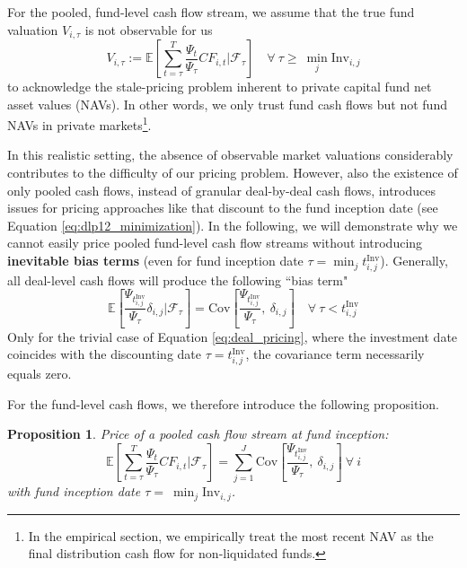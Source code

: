 \documentclass[12pt]{article}
\newtheorem{proposition}{Proposition}
\begin{document}
For the pooled, fund-level cash flow stream, we assume that the true fund valuation $V_{i,\tau}$ is not observable for us
\begin{equation}
	\label{eq:fund_valuation}
	V_{i,\tau} :=
	\mathbb{E} \left[ 
	\sum_{t = \tau}^T
	\frac{\Psi_{t}}{\Psi_{\tau}}
	{CF}_{i,t}
	\left| \mathcal{F}_{\tau} \right.
	\right]
	\quad \forall \ \tau \geq \ \min_j \mathrm{Inv}_{i,j}
\end{equation}
to acknowledge the stale-pricing problem inherent to private capital fund net asset values (NAVs).
In other words, we only trust fund cash flows but not fund NAVs in private markets\footnote{In the empirical section, we empirically treat the most recent NAV as the final distribution cash flow for non-liquidated funds.}.

In this realistic setting, the absence of observable market valuations considerably contributes to the difficulty of our pricing problem.
However, also the existence of only pooled cash flows, instead of granular deal-by-deal cash flows, introduces issues for pricing approaches like \cite{DLP12} that discount to the fund inception date (see Equation \ref{eq:dlp12_minimization}).
In the following, we will demonstrate why we cannot easily price pooled fund-level cash flow streams without introducing \textbf{inevitable bias terms} (even for fund inception date $\tau = \min_j t_{i,j}^{\mathrm{Inv}}$).
Generally, all deal-level cash flows will produce the following ``bias term"
\begin{equation}
	\label{eq:deal_level_bias}
	\mathbb{E} \left[ 
	\frac{\Psi_{t_{i,j}^{\mathrm{Inv}}}}{\Psi_{\tau}}
	\delta_{i,j}
	\left| \mathcal{F}_{\tau} \right.
	\right]
	=
	\mathrm{Cov} \left[ \frac{\Psi_{t_{i,j}^{\mathrm{Inv}}}}{\Psi_{\tau}}, \ \delta_{i,j} \right]
	\quad \forall \ \tau < t_{i,j}^{\mathrm{Inv}}
\end{equation}
Only for the trivial case of Equation \ref{eq:deal_pricing}, where the investment date coincides with the discounting date $\tau =  t_{i,j}^{\mathrm{Inv}}$, the covariance term necessarily equals zero.

For the fund-level cash flows, we therefore introduce the following proposition.
\begin{proposition}
	\label{theo:pooled_bias}
	Price of a pooled cash flow stream at fund inception: \\
	\begin{equation}
		\label{eq:price_pooled_cash_flows}
		\mathbb{E} \left[ 
		\sum_{t = \tau}^T
		\frac{\Psi_{t}}{\Psi_{\tau}}
		{CF}_{i,t}
		\left| \mathcal{F}_{\tau} \right.
		\right]
		=
		\sum_{j=1}^J
		\mathrm{Cov} \left[ \frac{\Psi_{t_{i,j}^{\mathrm{Inv}}}}{\Psi_{\tau}}, \ \delta_{i,j} \right]
		\ \forall \ i
	\end{equation}
	with fund inception date $\tau = \ \min_j \mathrm{Inv}_{i,j}$.
\end{proposition}
\end{document}
